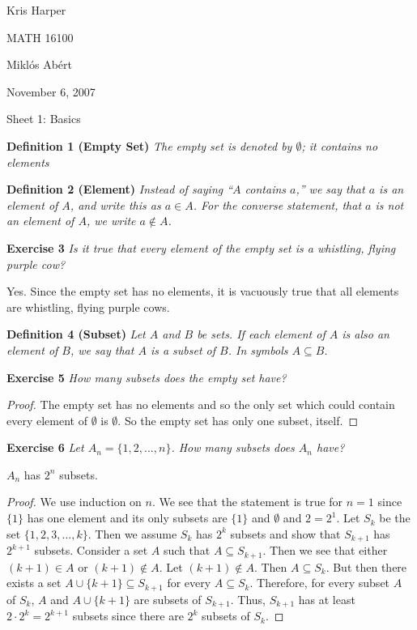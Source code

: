 \documentclass{article}
\begin{document}
\begin{flushright}
Kris Harper

MATH 16100

Mikl\'{o}s Ab\'{e}rt

November 6, 2007
\end{flushright}

\begin{flushleft}

\Large

Sheet 1: Basics\newline

\normalsize

\textbf{Definition 1 (Empty Set)}
\textsl{The empty set is denoted by $\emptyset$; it contains no elements}\newline

\textbf{Definition 2 (Element)}
\textsl{Instead of saying ``$A$ contains $a$,'' we say that $a$ is an element of $A$, and write this as $a \in A$. For the converse statement, that $a$ is not an element of $A$, we write $a \notin A$.}\newline

\textbf{Exercise 3}
\textsl{Is it true that every element of the empty set is a whistling, flying purple cow?}\newline

Yes. Since the empty set has no elements, it is vacuously true that all elements are whistling, flying purple cows.\newline

\textbf{Definition 4 (Subset)}
\textsl{Let $A$ and $B$ be sets. If each element of $A$ is also an element of $B$, we say that $A$ is a subset of $B$. In symbols $A \subseteq B$.}\newline

\textbf{Exercise 5}
\textsl{How many subsets does the empty set have?}
\begin{proof}
The empty set has no elements and so the only set which could contain every element of $\emptyset$ is $\emptyset$. So the empty set has only one subset, itself.
\end{proof}

\textbf{Exercise 6}
\textsl{Let $A_n=\{1,2,...,n\}$. How many subsets does $A_n$ have?}\newline

$A_n$ has $2^n$ subsets.
\begin{proof}
We use induction on $n$. We see that the statement is true for $n=1$ since $\{1\}$ has one element and its only subsets are $\{1\}$ and $\emptyset$ and $2=2^1$. Let $S_k$ be the set $\{1,2,3,...,k\}$. Then we assume $S_k$ has $2^k$ subsets and show that $S_{k+1}$ has $2^{k+1}$ subsets. Consider a set $A$ such that $A \subseteq S_{k+1}$. Then we see that either $(k+1) \in A$ or $(k+1) \notin A$. Let $(k+1) \notin A$. Then $A \subseteq S_k$. But then there exists a set $A \cup \{k+1\} \subseteq S_{k+1}$ for every $A \subseteq S_k$. Therefore, for every subset $A$ of $S_k$, $A$ and $A \cup \{k+1\}$ are subsets of $S_{k+1}$. Thus, $S_{k+1}$ has at least $2 \cdot 2^k=2^{k+1}$ subsets since there are $2^k$ subsets of $S_k$.\newline


\end{proof}
\end{flushleft}
\end{document}
